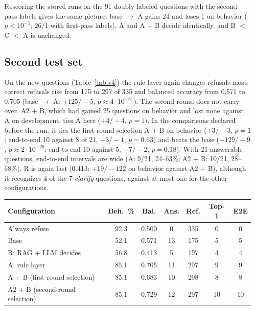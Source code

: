 Rescoring the stored runs on the 91 doubly labeled questions with the second-pass labels gives the same picture: base $\rightarrow$ A gains
24 and loses 1 on behavior ($p<10^{-5}$; 26/1 with first-pass labels), A and A + B decide identically, and B $<$ C $<$ A is unchanged.

\subsection{Second test set}

On the new questions (Table~\ref{tab:v4}) the rule layer again changes refusals most: correct refusals rise from 175 to 297 of 335 and
balanced accuracy from 0.571 to 0.705 (base $\rightarrow$ A: $+125/-5$, $p\approx 4\cdot10^{-31}$). The second round does not carry over.
A2 + B, which had gained 25 questions on behavior and lost none against A on development, ties A here ($+4/-4$, $p=1$). In the comparisons
declared before the run, it ties the first-round selection A + B on behavior ($+3/-3$, $p=1$; end-to-end 10 against 8 of 21, $+3/-1$,
$p=0.63$) and beats the base ($+129/-9$, $p\approx 2\cdot10^{-28}$; end-to-end 10 against 5, $+7/-2$, $p=0.18$). With 21 answerable
questions, end-to-end intervals are wide (A: 9/21, 24--63\%; A2 + B: 10/21, 28--68\%). R is again last (0.413; $+19/-122$ on behavior
against A2 + B), although it recognizes 4 of the 7 \emph{clarify} questions, against at most one for the other configurations.

\begin{table}[h]
{\begin{tabular}{@{}lcccccc@{}}\toprule
Configuration & Beh.\ \% & Bal. & Ans. & Ref. & Top-1 & E2E \\ \midrule
Always refuse & 92.3 & 0.500 & 0 & 335 & 0 & 0 \\
Base & 52.1 & 0.571 & 13 & 175 & 5 & 5 \\
R: RAG + LLM decides & 56.8 & 0.413 & 5 & 197 & 4 & 4 \\
A: rule layer & 85.1 & 0.705 & 11 & 297 & 9 & 9 \\
A + B (first-round selection) & 85.1 & 0.683 & 10 & 298 & 8 & 8 \\
A2 + B (second-round selection) & 85.1 & 0.729 & 12 & 297 & 10 & 10 \\ \bottomrule
\end{tabular}}
\end{table}
